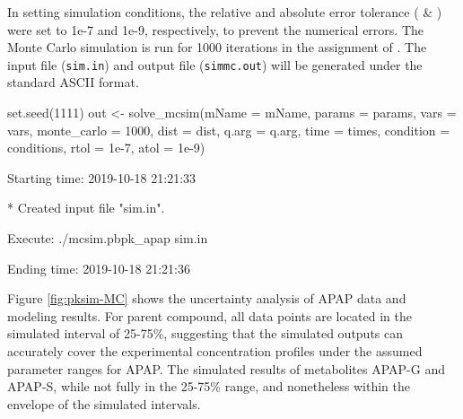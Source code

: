 In setting simulation conditions, the relative and absolute error
tolerance ( \& ) were set to 1e-7 and 1e-9,
respectively, to prevent the numerical errors. The Monte Carlo
simulation is run for 1000 iterations in the assignment of
. The input file (\texttt{sim.in}) and output file
(\texttt{simmc.out}) will be generated under the standard ASCII format.

\begin{Schunk}
\begin{Sinput}
set.seed(1111)
out <- solve_mcsim(mName = mName, params = params, vars = vars,
                   monte_carlo = 1000, dist = dist, q.arg = q.arg, 
                   time = times, condition = conditions, 
                   rtol = 1e-7, atol = 1e-9)
\end{Sinput}
\begin{Soutput}
  Starting time: 2019-10-18 21:21:33
\end{Soutput}
\begin{Soutput}
  * Created input file "sim.in".
\end{Soutput}
\begin{Soutput}
  Execute: ./mcsim.pbpk_apap sim.in
\end{Soutput}
\begin{Soutput}
  Ending time: 2019-10-18 21:21:36
\end{Soutput}
\end{Schunk}

Figure \ref{fig:pksim-MC} shows the uncertainty analysis of APAP data
and modeling results. For parent compound, all data points are located
in the simulated interval of 25-75\%, suggesting that the simulated
outputs can accurately cover the experimental concentration profiles
under the assumed parameter ranges for APAP. The simulated results of
metabolites APAP-G and APAP-S, while not fully in the 25-75\% range, and
nonetheless within the envelope of the simulated intervals.

